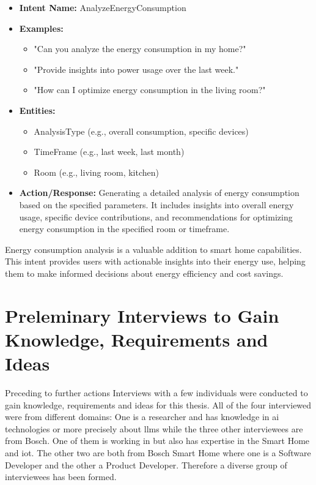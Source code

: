 \begin{itemize}
    \item \textbf{Intent Name:} AnalyzeEnergyConsumption
    \item \textbf{Examples:}
    \begin{itemize}
        \item "Can you analyze the energy consumption in my home?"
        \item "Provide insights into power usage over the last week."
        \item "How can I optimize energy consumption in the living room?"
    \end{itemize}
    \item \textbf{Entities:}
    \begin{itemize}
        \item AnalysisType (e.g., overall consumption, specific devices)
        \item TimeFrame (e.g., last week, last month)
        \item Room (e.g., living room, kitchen)
    \end{itemize}
    \item \textbf{Action/Response:} Generating a detailed analysis of energy consumption based on the specified parameters. It includes insights into overall energy usage, specific device contributions, and recommendations for optimizing energy consumption in the specified room or timeframe.
\end{itemize}

Energy consumption analysis is a valuable addition to smart home capabilities. This intent provides users with actionable insights into their energy use, helping them to make informed decisions about energy efficiency and cost savings.


\section{Preleminary Interviews to Gain Knowledge, Requirements and Ideas}
Preceding to further actions Interviews with a few individuals were conducted to gain knowledge, requirements and ideas for this thesis.
All of the four interviewed were from different domains: One is a researcher and has knowledge in \gls{ai} technologies or more precisely about \glspl{llm} while the three other interviewees are from Bosch.
One of them is working in  but also has expertise in the Smart Home and \gls{iot}. 
The other two are both from Bosch Smart Home where one is a Software Developer and the other a Product Developer.
Therefore a diverse group of interviewees has been formed.

